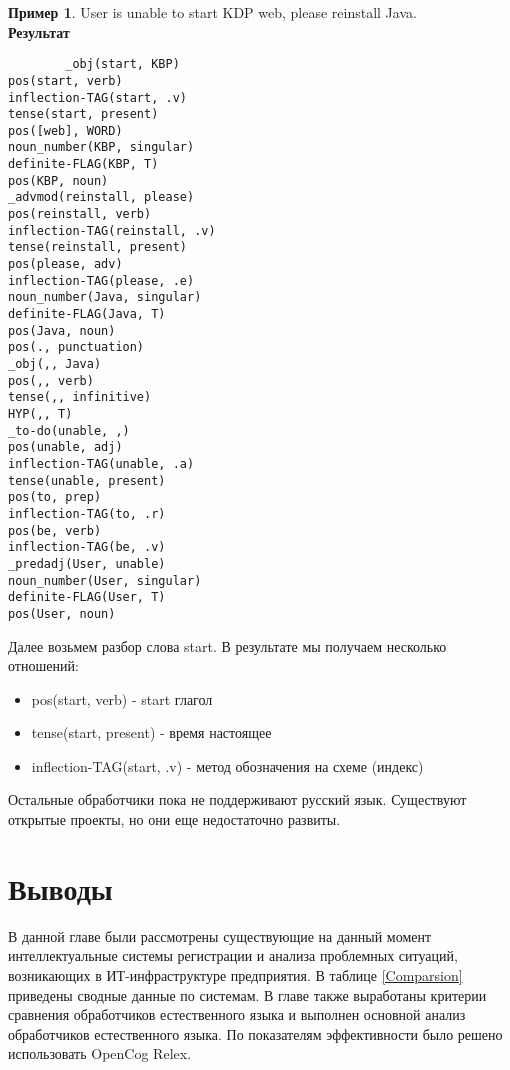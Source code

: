 \textbf{Пример 1}. User is unable to start KDP web, please reinstall Java.\\
\textbf{Результат} 
\begin{verbatim}
		_obj(start, KBP)
pos(start, verb)
inflection-TAG(start, .v)
tense(start, present)
pos([web], WORD)
noun_number(KBP, singular)
definite-FLAG(KBP, T)
pos(KBP, noun)
_advmod(reinstall, please)
pos(reinstall, verb)
inflection-TAG(reinstall, .v)
tense(reinstall, present)
pos(please, adv)
inflection-TAG(please, .e)
noun_number(Java, singular)
definite-FLAG(Java, T)
pos(Java, noun)
pos(., punctuation)
_obj(,, Java)
pos(,, verb)
tense(,, infinitive)
HYP(,, T)
_to-do(unable, ,)
pos(unable, adj)
inflection-TAG(unable, .a)
tense(unable, present)
pos(to, prep)
inflection-TAG(to, .r)
pos(be, verb)
inflection-TAG(be, .v)
_predadj(User, unable)
noun_number(User, singular)
definite-FLAG(User, T)
pos(User, noun)

\end{verbatim}



Далее возьмем разбор слова start. В результате мы получаем несколько отношений:
\begin{itemize}
	\item pos(start, verb) - start глагол
	\item tense(start, present) - время настоящее
	\item inflection-TAG(start, .v) -  метод обозначения на схеме (индекс)
\end{itemize} \par
Остальные обработчики пока не поддерживают русский язык. Существуют открытые проекты, но они еще недостаточно развиты.
\section{Выводы}
В данной главе были рассмотрены существующие на данный момент интеллектуальные системы регистрации и анализа проблемных ситуаций, возникающих в ИТ-инфраструктуре предприятия.
 В таблице \ref{Comparsion} приведены сводные данные по системам. В главе также выработаны критерии сравнения обработчиков естественного языка и выполнен основной анализ обработчиков естественного языка. По показателям эффективности было решено использовать OpenCog Relex.

